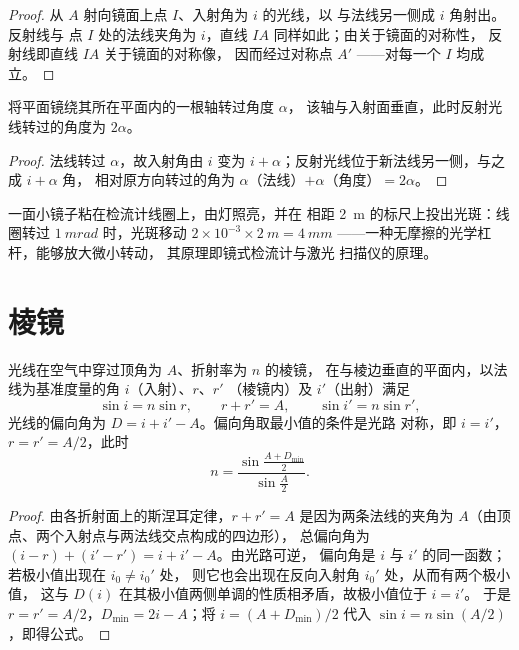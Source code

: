 \begin{proof}
从 $A$ 射向镜面上点 $I$、入射角为 $i$ 的光线，以
与法线另一侧成 $i$ 角射出。反射线与
点 $I$ 处的法线夹角为 $i$，直线 $IA$ 同样如此；由关于镜面的对称性，
反射线即直线 $IA$ 关于镜面的对称像，
因而经过对称点 $A'$ ——对每一个
$I$ 均成立。
\end{proof}

\begin{proposition}[转动平面镜]\label{prop:b1:rays-reflection-refraction:rotation}
将平面镜绕其所在平面内的一根轴转过角度 $\alpha$，
该轴与入射面垂直，此时反射光线转过的角度为
$2\alpha$。
\end{proposition}

\begin{proof}
法线转过 $\alpha$，故入射角由 $i$ 变为
$i + \alpha$；反射光线位于新法线另一侧，与之成 $i + \alpha$ 角，
相对原方向转过的角为 $\alpha$（法线）$+ \alpha$（角度）$=
2\alpha$。
\end{proof}

\begin{example}[检流计的杠杆]\label{ex:b1:rays-reflection-refraction:galvanometer}
一面小镜子粘在检流计线圈上，由灯照亮，并在
相距 \qty{2}{m} 的标尺上投出光斑：线圈转过
$\qty{1}{mrad}$ 时，光斑移动 $2 \times 10^{-3} \times
\qty{2}{m} = \qty{4}{mm}$ ——一种无摩擦的光学杠杆，能够放大微小转动，
其原理即镜式检流计与激光
扫描仪的原理。
\end{example}

\section{棱镜}

\begin{proposition}[棱镜公式]\label{prop:b1:rays-reflection-refraction:prism}
光线在空气中穿过顶角为 $A$、折射率为 $n$ 的棱镜，
在与棱边垂直的平面内，以法线为基准度量的角 $i$（入射）、$r$、$r'$
（棱镜内）及 $i'$（出射）满足
\[
\sin i = n \sin r, \qquad r + r' = A, \qquad \sin i' = n \sin r',
\]
光线的偏向角为 $D = i + i' - A$。偏向角取最小值的条件是光路
对称，即 $i = i'$，$r = r' = A/2$，此时
\[
n = \frac{\sin\frac{A + D_{\min}}{2}}{\sin\frac{A}{2}} .
\]
\end{proposition}

\begin{proof}
由各折射面上的斯涅耳定律，$r + r' = A$ 是因为两条法线的夹角为
$A$（由顶点、两个入射点与两法线交点构成的四边形），
总偏向角为
$(i - r) + (i' - r') = i + i' - A$。由光路可逆，
偏向角是 $i$ 与 $i'$ 的同一函数；若极小值出现在 $i_0 \neq i_0'$ 处，
则它也会出现在反向入射角
$i_0'$ 处，从而有两个极小值，
这与 $D(i)$ 在其极小值两侧单调的性质相矛盾，故极小值位于 $i = i'$。
于是 $r = r' = A/2$，$D_{\min} = 2i - A$；将 $i = (A +
D_{\min})/2$ 代入 $\sin i = n\sin(A/2)$，即得公式。
\end{proof}

